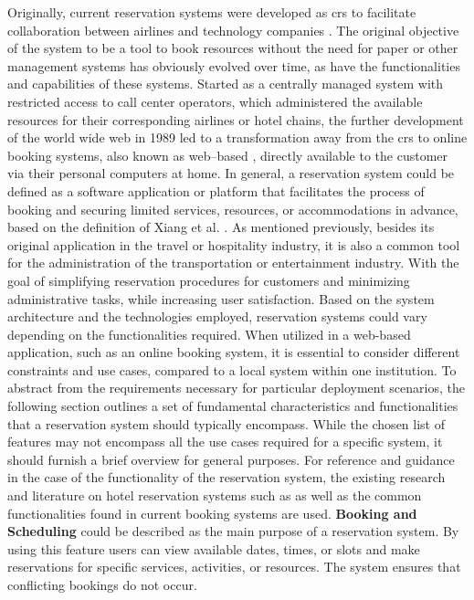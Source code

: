Originally, current reservation systems were developed as \acrfull{crs} to facilitate collaboration between airlines and technology companies \cite{xiang_evolution_2020}. The original objective of the system to be a tool to book resources without the need for paper or other management systems has obviously evolved over time, as have the functionalities and capabilities of these systems.
Started as a centrally managed system with restricted access to call center operators, which administered the available resources for their corresponding airlines or hotel chains, the further development of the world wide web in 1989 led to a transformation away from the \acrshort{crs} to online booking systems, also known as web--based , directly available to the customer via their personal computers at home.
In general, a reservation system could be defined as a software application or platform that facilitates the process of booking and securing limited services, resources, or accommodations in advance, based on the definition of Xiang et al. \cite[p.~2]{xiang_evolution_2020}. 
As mentioned previously, besides its original application in the travel or hospitality industry, it is also a common tool for the administration of the transportation or entertainment industry. With the goal of simplifying reservation procedures for customers and minimizing administrative tasks, while increasing user satisfaction.
Based on the system architecture and the technologies employed, reservation systems could vary depending on the functionalities required. When utilized in a web-based application, such as an online booking system, it is essential to consider different constraints and use cases, compared to a local system within one institution. 
To abstract from the requirements necessary for particular deployment scenarios, the following section outlines a set of fundamental characteristics and functionalities that a reservation system should typically encompass. While the chosen list of features may not encompass all the use cases required for a specific system, it should furnish a brief overview for general purposes.
For reference and guidance in the case of the functionality of the reservation system, the existing research and literature on hotel reservation systems such as \cite{delizo_online_2013,bemile_online_nodate} as well as the common functionalities found in current booking systems are used.
\textbf{Booking and Scheduling} could be described as the main purpose of a reservation system. By using this feature users can view available dates, times, or slots and make reservations for specific services, activities, or resources. The system ensures that conflicting bookings do not occur.
